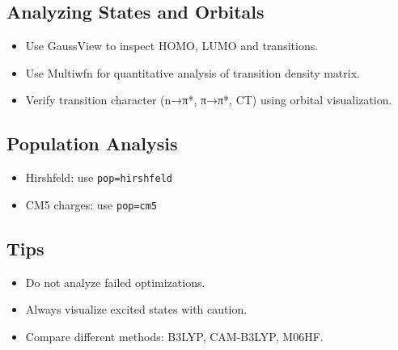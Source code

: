 \subsection*{Analyzing States and Orbitals}

\begin{itemize}
  \item Use GaussView to inspect HOMO, LUMO and transitions.
  \item Use Multiwfn for quantitative analysis of transition density matrix.
  \item Verify transition character (n→π*, π→π*, CT) using orbital visualization.
\end{itemize}

\subsection*{Population Analysis}

\begin{itemize}
  \item Hirshfeld: use \texttt{pop=hirshfeld}
  \item CM5 charges: use \texttt{pop=cm5}
\end{itemize}

\subsection*{Tips}

\begin{itemize}
  \item Do not analyze failed optimizations.
  \item Always visualize excited states with caution.
  \item Compare different methods: B3LYP, CAM-B3LYP, M06HF.
\end{itemize}
